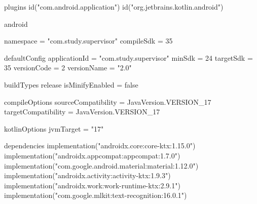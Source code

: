 plugins {
    id("com.android.application")
    id("org.jetbrains.kotlin.android")
}

android {
    namespace = "com.study.supervisor"
    compileSdk = 35

    defaultConfig {
        applicationId = "com.study.supervisor"
        minSdk = 24
        targetSdk = 35
        versionCode = 2
        versionName = "2.0"
    }

    buildTypes {
        release {
            isMinifyEnabled = false
        }
    }

    compileOptions {
        sourceCompatibility = JavaVersion.VERSION_17
        targetCompatibility = JavaVersion.VERSION_17
    }

    kotlinOptions {
        jvmTarget = "17"
    }
}

dependencies {
    implementation("androidx.core:core-ktx:1.15.0")
    implementation("androidx.appcompat:appcompat:1.7.0")
    implementation("com.google.android.material:material:1.12.0")
    implementation("androidx.activity:activity-ktx:1.9.3")
    implementation("androidx.work:work-runtime-ktx:2.9.1")
    implementation("com.google.mlkit:text-recognition:16.0.1")
}
